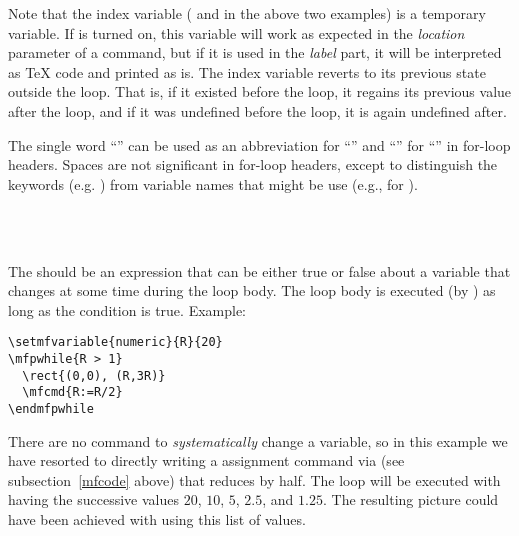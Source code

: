 \documentclass[letterpaper]{article}
\begin{document}
Note that the index variable ( and  in the above
two examples) is a temporary \MF{} variable. If  is turned
on, this variable will work as expected in the \emph{location} parameter
of a  command, but if it is used in the \emph{label} part, it
will be interpreted as \TeX{} code and printed as is. The index variable
reverts to its previous state outside the loop. That is, if it existed
before the loop, it regains its previous value after the loop, and if it
was undefined before the loop, it is again undefined after.

The single word ``'' can be used as an abbreviation for
``'' and ``'' for ``''
in for-loop headers. Spaces are not significant in for-loop headers,
except to distinguish the keywords (e.g. ) from variable names
that might be use (e.g., for ).

\begin{cd}
  \\
  \ \\
%
\end{cd}

The  should be an expression that can be either true or
false about a \MF{} variable that changes at some time during the loop
body. The loop body is executed (by \MF) as long as the condition is
true. Example:
\begin{verbatim}
\setmfvariable{numeric}{R}{20}
\mfpwhile{R > 1}
  \rect{(0,0), (R,3R)}
  \mfcmd{R:=R/2}
\endmfpwhile
\end{verbatim}
There are no \mfp{} command to \emph{systematically} change a variable,
so in this example we have resorted to directly writing a \MF{} assignment
command via  (see subsection~\ref{mfcode} above) that reduces
 by half. The loop will be executed with  having the
successive values $20$, $10$, $5$, $2.5$, and $1.25$. The resulting
picture could have been achieved with  using this list of
values.

\begin{cd}
\\
 \ \\
\\
 \ \\
%
%
%
%
\end{cd}
\end{document}
